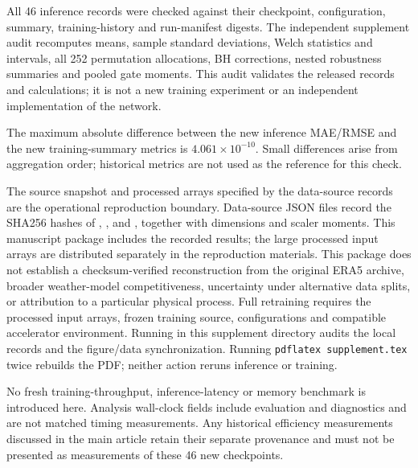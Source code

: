 \documentclass[10pt,a4paper]{article}
\begin{document}
All 46 inference records were checked against their checkpoint, configuration, summary, training-history and run-manifest digests. The independent supplement audit recomputes means, sample standard deviations, Welch statistics and intervals, all 252 permutation allocations, BH corrections, nested robustness summaries and pooled gate moments. This audit validates the released records and calculations; it is not a new training experiment or an independent implementation of the network.

The maximum absolute difference between the new inference MAE/RMSE and the new training-summary metrics is $4.061\times10^{-10}$. Small differences arise from aggregation order; historical metrics are not used as the reference for this check.

The source snapshot and processed arrays specified by the data-source records are the operational reproduction boundary. Data-source JSON files record the SHA256 hashes of , ,  and , together with dimensions and scaler moments. This manuscript package includes the recorded results; the large processed input arrays are distributed separately in the reproduction materials. This package does not establish a checksum-verified reconstruction from the original ERA5 archive, broader weather-model competitiveness, uncertainty under alternative data splits, or attribution to a particular physical process. Full retraining requires the processed input arrays, frozen training source, configurations and compatible accelerator environment. Running  in this supplement directory audits the local records and the figure/data synchronization. Running \texttt{pdflatex supplement.tex} twice rebuilds the PDF; neither action reruns inference or training.

No fresh training-throughput, inference-latency or memory benchmark is introduced here. Analysis wall-clock fields include evaluation and diagnostics and are not matched timing measurements. Any historical efficiency measurements discussed in the main article retain their separate provenance and must not be presented as measurements of these 46 new checkpoints.
\end{document}
